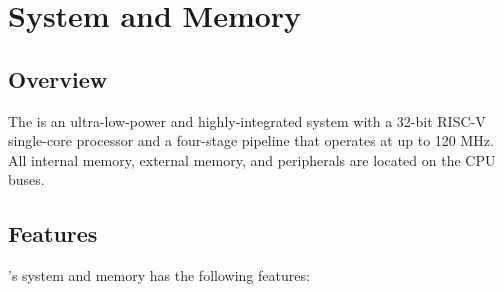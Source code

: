 \documentclass[main\_\_EN.tex]{subfiles}
\begin{document}

\ifglobal
\else
    {\let\clearpage\relax \listoftodos}
    {\let\clearpage\relax \listofdonetodos}
    \tableofcontents
\fi



\hypertarget{sysmem}{}
\chapter{System and Memory}
\label{mod:sysmem}


\section{Overview}

The \chipname{} is an ultra-low-power and highly-integrated system with a 32-bit RISC-V single-core processor and a four-stage pipeline that operates at up to 120 MHz. All internal memory, external memory, and peripherals are located on the CPU buses.



\section{Features}

\chipname{}'s system and memory has the following features:
\end{document}
